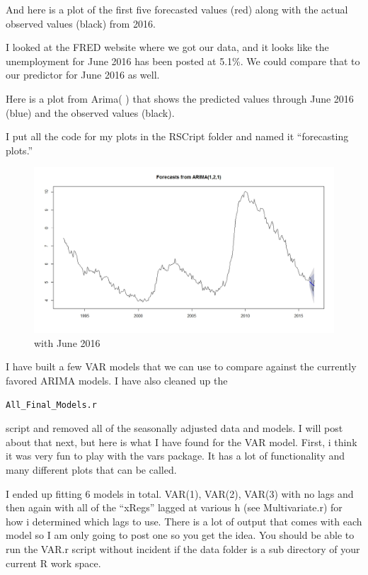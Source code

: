 \documentclass[twoside,twocolumn]{article}
\begin{document}
 And here is a plot of the first five forecasted values (red) along with the actual observed values (black) from 2016. 
 
 I looked at the FRED website where we got our data, and it looks like the unemployment for June 2016 has been posted at 5.1\%. We could compare that to our predictor for June 2016 as well.

Here is a plot from Arima( ) that shows the predicted values through June 2016 (blue) and the observed values (black).

I put all the code for my plots in the RSCript folder and named it ``forecasting plots.''

  \begin{figure}[H]
    	\centering
     	\caption{with June 2016}
     	\includegraphics[width=\linewidth]{images/forejune}
 \end{figure}

I have built a few VAR models that we can use to compare against the currently favored ARIMA models. I have also cleaned up the \begin{verbatim}All_Final_Models.r\end{verbatim} script and removed all of the seasonally adjusted data and models. I will post about that next, but here is what I have found for the VAR model. First, i think it was very fun to play with the vars package. It has a lot of functionality and many different plots that can be called.

I ended up fitting 6 models in total. VAR(1), VAR(2), VAR(3) with no lags and then again with all of the ``xRegs'' lagged at various h (see Multivariate.r) for how i determined which lags to use. There is a lot of output that comes with each model so I am only going to post one so you get the idea. You should be able to run the VAR.r script without incident if the data folder is a sub directory of your current R work space.
\end{document}
